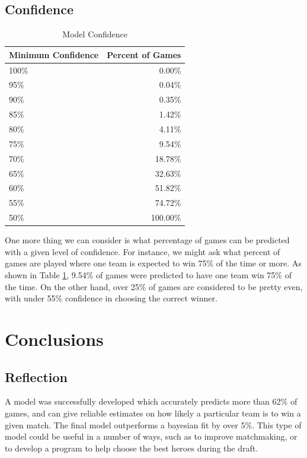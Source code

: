 \documentclass[twoside,twocolumn]{article}
\begin{document}
\subsection{Confidence}

\begin{table}[h]
\caption{Model Confidence}
\label{table:confidence}
\centering
\begin{tabular}{lr}
\toprule
Minimum Confidence & Percent of Games \\
\midrule
100\% & 0.00\% \\
95\% & 0.04\% \\
90\% & 0.35\% \\
85\% & 1.42\% \\
80\% & 4.11\% \\
75\% & 9.54\% \\
70\% & 18.78\% \\
65\% & 32.63\% \\
60\% & 51.82\% \\
55\% & 74.72\% \\
50\% & 100.00\% \\
\bottomrule
\end{tabular}
\end{table}

One more thing we can consider is what percentage of games can be predicted with a given level of confidence.  For instance, we might ask what percent of games are played where one team is expected to win 75\% of the time or more.  As shown in Table \ref{table:confidence}, 9.54\% of games were predicted to have one team win 75\% of the time.  On the other hand, over 25\% of games are considered to be pretty even, with under 55\% confidence in choosing the correct winner.


\section{Conclusions}

\subsection{Reflection}
A model was successfully developed which accurately predicts more than 62\% of games, and can give reliable estimates on how likely a particular team is to win a given match.  The final model outperforms a bayesian fit by over 5\%.  This type of model could be useful in a number of ways, such as to improve matchmaking, or to develop a program to help choose the best heroes during the draft. 
\end{document}
